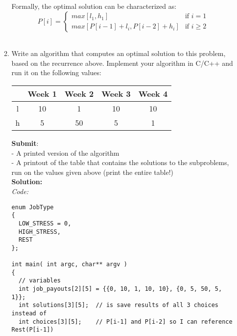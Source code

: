 \documentclass[11pts]{article}
\begin{document}
\begin{enumerate}
\begin{enumerate}
  Formally, the optimal solution can be characterized as:
  \begin{equation*}
    P[i] = \left\{
      \begin{array}{rl}
        max[l_1, h_1] & \text{if } i = 1 \\
        max[ P[i-1] + l_i, P[i-2] + h_i ] & \text{if } i \ge 2
      \end{array} \right.
  \end{equation*}
  \\

  \item Write an algorithm that computes an optimal solution to this
        problem, based on the recurrence above. Implement your algorithm
        in C/C++ and run it on the following values:

    \begin{center}
    \begin{tabular}{| c || c | c | c | c |}
      \hline
          & Week 1 & Week 2 & Week 3 & Week 4  \\
      \hline \hline
      l   &  10    &   1    &   10   &   10    \\
      \hline
      h   &   5    &   50   &   5    &   1     \\
      \hline
    \end{tabular}
    \end{center}

  \textbf{Submit}: \\
  - A printed version of the algorithm \\
  - A printout of the table that contains the solutions to the subproblems,
  run on the 
  values given above (print the entire table!) \\

  \textbf{Solution:} \\
  \textit{Code:} \\
  \begin{verbatim}
enum JobType
{
  LOW_STRESS = 0,
  HIGH_STRESS,
  REST
};

int main( int argc, char** argv )
{
  // variables
  int job_payouts[2][5] = {{0, 10, 1, 10, 10}, {0, 5, 50, 5, 1}};
  int solutions[3][5];  // is save results of all 3 choices instead of
  int choices[3][5];    // P[i-1] and P[i-2] so I can reference Rest(P[i-1])


\end{verbatim}
\end{enumerate}
\end{enumerate}
\end{document}
